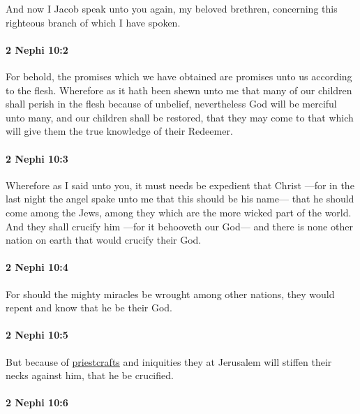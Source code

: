 			And now I Jacob speak unto you again, my beloved brethren,
			concerning this righteous branch of which I have spoken.

		\paragraph{2 Nephi 10:2} %
			\label{2NEPHI-10-2}

			For behold, the promises which we have obtained
			are promises unto us according to the flesh.
			Wherefore as it hath been shewn unto me
			that many of our children shall perish in the flesh because of unbelief,
			nevertheless God will be merciful unto many,
			and our children shall be restored,
			that they may come to that which will give them
			the true knowledge of their Redeemer.

		\paragraph{2 Nephi 10:3} %
			\label{2NEPHI-10-3}

			Wherefore as I said unto you,
			it must needs be expedient that Christ
			---for in the last night the angel spake unto me
			that this should be his name---
			that he should come among the Jews,
			among they which are the more wicked part of the world.
			And they shall crucify him
			---for it behooveth our God---
			and there is none other nation on earth
			that would crucify their God.

		\paragraph{2 Nephi 10:4} %
			\label{2NEPHI-10-4}

			For should the mighty miracles be wrought among other nations,
			they would repent and know that he be their God.

		\paragraph{2 Nephi 10:5} %
			\label{2NEPHI-10-5}

			But because of \hyperref[PRIESTCRAFT]{priestcrafts} and iniquities
			they at Jerusalem will stiffen their necks against him,
			that he be crucified.

		\paragraph{2 Nephi 10:6} %
			\label{2NEPHI-10-6}

